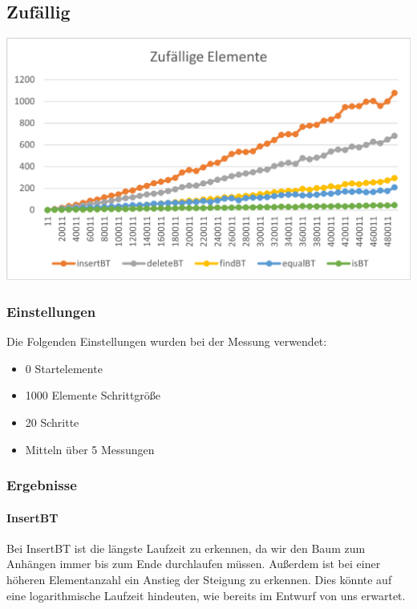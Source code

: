 \documentclass[11pt]{article}
\begin{document}
    \subsection{Zufällig}\label{subsec:zufaellig}

    \begin{center}
        \includegraphics[width=0.9\columnwidth] {ZeitAvg.pdf}
    \end{center}

    \subsubsection{Einstellungen}
    Die Folgenden Einstellungen wurden bei der Messung verwendet:
    \begin{itemize}
        \item 0 Startelemente
        \item 1000 Elemente Schrittgröße
        \item 20 Schritte
        \item Mitteln über 5 Messungen
    \end{itemize}
    
    \subsubsection{Ergebnisse}
        \paragraph{InsertBT}
        
        Bei InsertBT ist die längste Laufzeit zu erkennen,
        da wir den Baum zum Anhängen immer bis zum Ende durchlaufen müssen.
        Außerdem ist bei einer höheren Elementanzahl ein Anstieg der Steigung zu erkennen.
        Dies könnte auf eine logarithmische Laufzeit hindeuten,
        wie bereits im Entwurf von uns erwartet.
\end{document}
